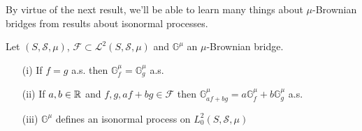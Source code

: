 By virtue of the next result, we'll be able to learn many things about $\mu$-Brownian bridges from results about isonormal processes.
\begin{prop}\label{prop:GeneralizedBrownianBridgeAndIsonormal}Let $(S, \mathcal{S}, \mu)$, $\mathcal{F} \subset \mathcal{L}^2(S, \mathcal{S}, \mu)$ and $\mathds{G}^\mu$ an $\mu$-Brownian bridge.
\begin{itemize}
\item[(i)] If $f=g$ a.s. then $\mathds{G}^\mu_f = \mathds{G}^\mu_g$ a.s.
\item[(ii)] If $a,b \in \mathbb{R}$ and $f,g, af+bg \in \mathcal{F}$ then $\mathds{G}^\mu_{af+bg} = a\mathds{G}^\mu_f + b \mathds{G}^\mu_g$ a.s.
\item[(iii)] $\mathds{G}^\mu$ defines an isonormal process on $L^2_0(S, \mathcal{S}, \mu)$
\end{itemize}
\end{prop}
